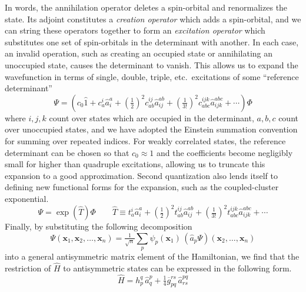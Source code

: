 In words, the annihilation operator deletes a spin-orbital and renormalizes the
state.
Its adjoint constitutes a {\itshape creation operator} which adds a
spin-orbital, and we can string these operators together to form an {\itshape
excitation operator} which substitutes one set of spin-orbitals in the
determinant with another.
In each case, an invalid operation, such as creating an occupied state or
annihilating an unoccupied state, causes the determinant to vanish.
This allows us to expand the wavefunction in terms of single, double, triple,
etc.\ excitations of some ``reference determinant''
\begin{equation}
    \label{eq:intro-ci-expansion}
    \Psi
    =
    \left(
        c_0
        \hat{1}
        +
        c_a^i
        \hat{a}^a_i
        +
        (\tfrac{1}{2})^2
        c_{ab}^{ij}
        \hat{a}^{ab}_{ij}
        +
        (\tfrac{1}{3!})^2
        c_{abc}^{ijk}
        \hat{a}^{abc}_{ijk}
        +
        \cdots
    \right)
    \Phi
\end{equation}
where \(i, j, k\) count over states which are occupied in the determinant, \(a,
b, c\) count over unoccupied states, and we have adopted the Einstein summation
convention for summing over repeated indices.
For weakly correlated states, the reference determinant can be chosen so that
\(c_0 \approx 1\) and the coefficients become negligibly small for higher than
quadruple excitations, allowing us to truncate this expansion to a good
approximation.
Second quantization also lends itself to defining new functional forms for the
expansion, such as the coupled-cluster exponential.
\begin{equation}
    \Psi
    =
    \exp(\hat{T})
    \Phi
    \qquad
    \hat{T}
    \equiv
    t_a^i
    \hat{a}^a_i
    +
    (\tfrac{1}{2})^2
    t_{ab}^{ij}
    \hat{a}^{ab}_{ij}
    +
    (\tfrac{1}{3!})^2
    t_{abc}^{ijk}
    \hat{a}^{abc}_{ijk}
    +
    \cdots
\end{equation}
Finally, by substituting the following decomposition
\begin{equation}
    \Psi(\mathbf{x}_1, \mathbf{x}_2, \ldots, \mathbf{x}_n)
    =
    \tfrac{1}{\sqrt{n}}
    \sum_p
    \psi_p(\mathbf{x}_1)\,
    (\hat{a}_p\Psi)(\mathbf{x}_2, \ldots, \mathbf{x}_n)
\end{equation}
into a general antisymmetric matrix element of the Hamiltonian, we find that the
restriction of \(\hat{H}\) to antisymmetric states can be expressed in the
following form.
\begin{equation}
    \hat{H}
    =
    h_p^q\,
    \hat{a}^p_q
    +
    \tfrac{1}{4}
    \overline{g}_{pq}^{rs}\,
    \hat{a}^{pq}_{rs}
\end{equation}
